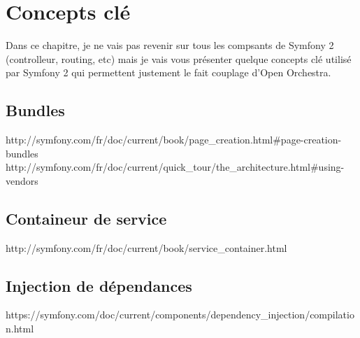 \chapter{Concepts clé }
Dans ce chapitre, je ne vais pas revenir sur tous les compsants de Symfony 2 (controlleur, routing, etc) mais je vais vous présenter quelque concepts clé utilisé par Symfony 2 qui permettent justement le fait couplage d'Open Orchestra.
\section{Bundles}
http://symfony.com/fr/doc/current/book/page_creation.html#page-creation-bundles
http://symfony.com/fr/doc/current/quick_tour/the_architecture.html#using-vendors
\section{Containeur de service}
http://symfony.com/fr/doc/current/book/service_container.html
\section{Injection de dépendances}
https://symfony.com/doc/current/components/dependency_injection/compilation.html